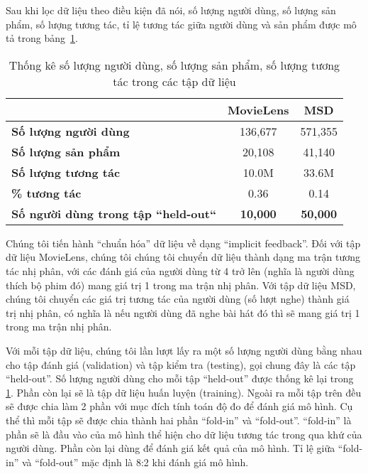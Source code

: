 Sau khi lọc dữ liệu theo điều kiện đã nói, số lượng người dùng, số lượng sản phẩm, số lượng tương tác, tỉ lệ tương tác giữa người dùng và sản phẩm được mô tả trong bảng~\ref{table_dataset}.
\begin{table}[]
\centering
    \begin{tabular}{|l|c|c|}
    \hline
                                                & \textbf{MovieLens} & \textbf{MSD}    \\ \hline
    \textbf{Số lượng người dùng}                  & 136,677            & 571,355         \\ \hline
    \textbf{Số lượng sản phẩm}                    & 20,108             & 41,140          \\ \hline
    \textbf{Số lượng tương tác}                   & 10.0M              & 33.6M           \\ \hline
    \textbf{\% tương tác}                         & 0.36               & 0.14            \\ \hline
    \textbf{Số người dùng trong tập ``held-out``} & \textbf{10,000}    & \textbf{50,000} \\ \hline
    \end{tabular}
   
    \caption{Thống kê số lượng người dùng, số lượng sản phẩm, số lượng tương tác trong các tập dữ liệu}
    \label{table_dataset}    
\end{table}

Chúng tôi tiến hành ``chuẩn hóa'' dữ liệu về dạng ``implicit feedback''. Đối với tập dữ liệu MovieLens, chúng tôi 
chúng tôi chuyển dữ liệu thành dạng ma trận tương tác nhị phân, với các đánh giá của người dùng từ 4 trở lên (nghĩa là người dùng thích bộ phim đó) mang giá trị 1 trong ma trận nhị phân.
Với tập dữ liệu MSD, chúng tôi chuyển các giá trị tương tác của người dùng (số lượt nghe) thành giá trị nhị phân, có nghĩa là nếu người dùng đã nghe bài hát đó thì sẽ mang giá trị 1 trong ma trận nhị phân.

Với mỗi tập dữ liệu, chúng tôi lần lượt lấy ra một số lượng người dùng bằng nhau cho tập đánh giá (validation) và tập kiểm tra (testing), gọi chung đây là các tập ``held-out''. 
Số lượng người dùng cho mỗi tập ``held-out'' được thống kê lại trong \ref{table_dataset}.
Phần còn lại sẽ là tập dữ liệu huấn luyện (training).
Ngoài ra mỗi tập trên đều sẽ được chia làm 2 phần với mục đích tính toán độ đo để đánh giá mô hình.
Cụ thể thì mỗi tập sẽ được chia thành hai phần ``fold-in'' và ``fold-out''.
``fold-in'' là phần sẽ là đầu vào của mô hình thể hiện cho dữ liệu tương tác trong qua khứ của người dùng. 
Phần còn lại dùng để đánh giá kết quả của mô hình.
Tỉ lệ giữa ``fold-in'' và ``fold-out'' mặc định là 8:2 khi đánh giá mô hình.


